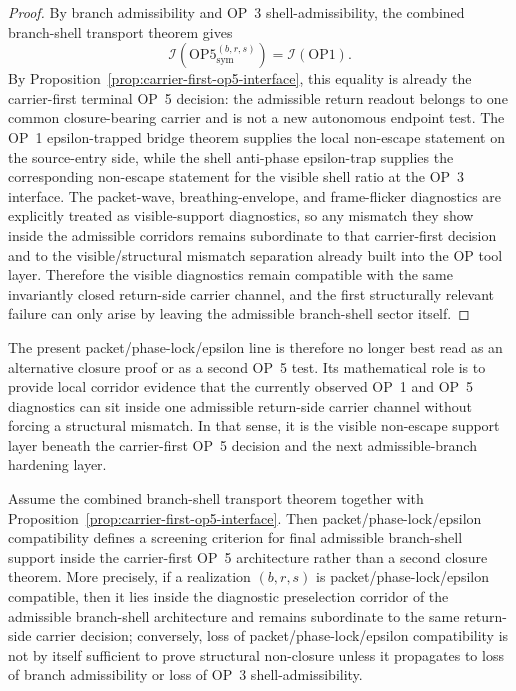 \begin{proof}
By branch admissibility and OP~3 shell-admissibility, the combined branch-shell transport theorem gives
\[
\mathcal{I}(\mathrm{OP5}^{(b,r,s)}_{\mathrm{sym}})=\mathcal{I}(\mathrm{OP1}).
\]
By Proposition~\ref{prop:carrier-first-op5-interface}, this equality is already the carrier-first terminal OP~5 decision: the admissible return readout belongs to one common closure-bearing carrier and is not a new autonomous endpoint test. The OP~1 epsilon-trapped bridge theorem supplies the local non-escape statement on the source-entry side, while the shell anti-phase epsilon-trap supplies the corresponding non-escape statement for the visible shell ratio at the OP~3 interface. The packet-wave, breathing-envelope, and frame-flicker diagnostics are explicitly treated as visible-support diagnostics, so any mismatch they show inside the admissible corridors remains subordinate to that carrier-first decision and to the visible/structural mismatch separation already built into the OP tool layer. Therefore the visible diagnostics remain compatible with the same invariantly closed return-side carrier channel, and the first structurally relevant failure can only arise by leaving the admissible branch-shell sector itself.
\end{proof}

\begin{remark}
The present packet/phase-lock/epsilon line is therefore no longer best read as an alternative closure proof or as a second OP~5 test. Its mathematical role is to provide local corridor evidence that the currently observed OP~1 and OP~5 diagnostics can sit inside one admissible return-side carrier channel without forcing a structural mismatch. In that sense, it is the visible non-escape support layer beneath the carrier-first OP~5 decision and the next admissible-branch hardening layer.
\end{remark}

\begin{proposition}
\label{prop:packet-phase-epsilon-screening}
Assume the combined branch-shell transport theorem together with Proposition~\ref{prop:carrier-first-op5-interface}. Then packet/phase-lock/epsilon compatibility defines a screening criterion for final admissible branch-shell support inside the carrier-first OP~5 architecture rather than a second closure theorem. More precisely, if a realization $(b,r,s)$ is packet/phase-lock/epsilon compatible, then it lies inside the diagnostic preselection corridor of the admissible branch-shell architecture and remains subordinate to the same return-side carrier decision; conversely, loss of packet/phase-lock/epsilon compatibility is not by itself sufficient to prove structural non-closure unless it propagates to loss of branch admissibility or loss of OP~3 shell-admissibility.
\end{proposition}

